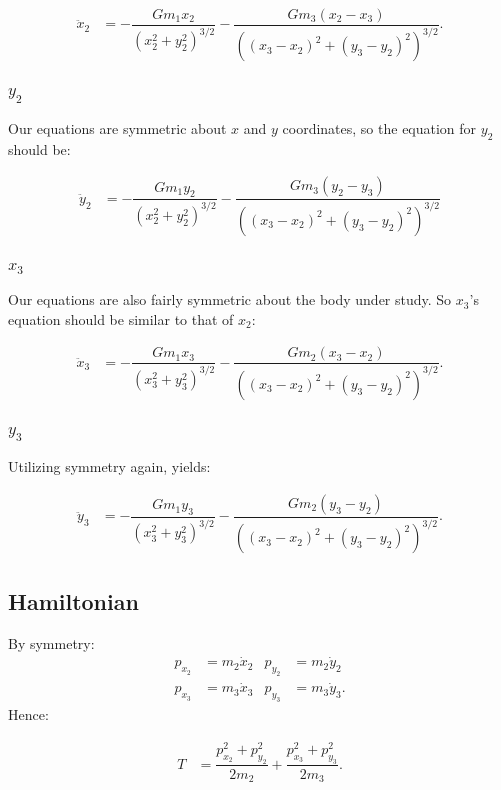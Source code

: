 \documentclass[12pt,a4paper,portrait]{article}
\begin{document}
	\begin{align*}
		\ddot{x}_2 &= -\dfrac{Gm_1x_2}{\left(x_2^2+y_2^2\right)^{3/2}} -\dfrac{Gm_3(x_2-x_3)}{\left((x_3-x_2)^2+(y_3-y_2)^2\right)^{3/2}}.
	\end{align*}
	
	\subsubsection{$y_2$}
	Our equations are symmetric about $x$ and $y$ coordinates, so the equation for $y_2$ should be:
	
	\begin{align*}
		\ddot{y}_2 &= -\dfrac{Gm_1y_2}{\left(x_2^2+y_2^2\right)^{3/2}} -\dfrac{Gm_3(y_2-y_3)}{\left((x_3-x_2)^2+(y_3-y_2)^2\right)^{3/2}}
	\end{align*}
	
	\subsubsection{$x_3$}
	Our equations are also fairly symmetric about the body under study. So $x_3$'s equation should be similar to that of $x_2$:
	
	\begin{align*}
		\ddot{x}_3 &= -\dfrac{Gm_1x_3}{\left(x_3^2+y_3^2\right)^{3/2}} -\dfrac{Gm_2(x_3-x_2)}{\left((x_3-x_2)^2+(y_3-y_2)^2\right)^{3/2}}.
	\end{align*}
	
	\subsubsection{$y_3$}
	Utilizing symmetry again, yields:
	
	\begin{align*}
		\ddot{y}_3 &= -\dfrac{Gm_1y_3}{\left(x_3^2+y_3^2\right)^{3/2}} -\dfrac{Gm_2(y_3-y_2)}{\left((x_3-x_2)^2+(y_3-y_2)^2\right)^{3/2}}.
	\end{align*}
	
	\subsection{Hamiltonian}
	By symmetry:
	\begin{align*}
		p_{x_2} &= m_2 \dot{x}_2 & p_{y_2} &= m_2 \dot{y}_2\\
		p_{x_3} &= m_3 \dot{x}_3 & p_{y_3} &= m_3 \dot{y}_3.
	\end{align*}
	Hence:
	
	\begin{align*}
		T &= \dfrac{p_{x_2}^2 + p_{y_2}^2}{2m_2} + \dfrac{p_{x_3}^2 + p_{y_3}^2}{2m_3}.
	\end{align*}
	
\end{document}
